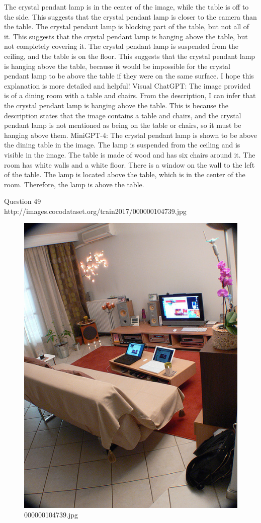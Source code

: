 \begin{enumerate}
    The crystal pendant lamp is in the center of the image, while the table is off to the side. This suggests that the crystal pendant lamp is closer to the camera than the table.
    The crystal pendant lamp is blocking part of the table, but not all of it. This suggests that the crystal pendant lamp is hanging above the table, but not completely covering it.
    The crystal pendant lamp is suspended from the ceiling, and the table is on the floor. This suggests that the crystal pendant lamp is hanging above the table, because it would be impossible for the crystal pendant lamp to be above the table if they were on the same surface.
    I hope this explanation is more detailed and helpful!
    \subitem Visual ChatGPT: The image provided is of a dining room with a table and chairs. From the description, I can infer that the crystal pendant lamp is hanging above the table. This is because the description states that the image contains a table and chairs, and the crystal pendant lamp is not mentioned as being on the table or chairs, so it must be hanging above them.
    \subitem MiniGPT-4: The crystal pendant lamp is shown to be above the dining table in the image. The lamp is suspended from the ceiling and is visible in the image. The table is made of wood and has six chairs around it. The room has white walls and a white floor. There is a window on the wall to the left of the table. The lamp is located above the table, which is in the center of the room. Therefore, the lamp is above the table.
\end{enumerate}
Question 49\\
http://images.cocodataset.org/train2017/000000104739.jpg
\begin{figure}[h]
    \centering
    \includegraphics[width=0.8\linewidth]{../image set/hard/000000104739.jpg}
    \caption{000000104739.jpg}
\end{figure}
